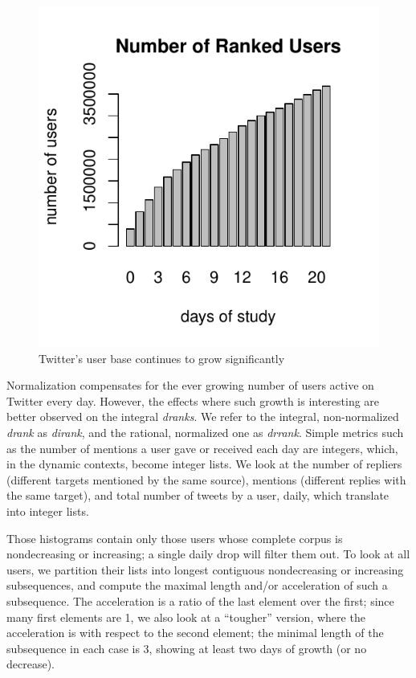 \documentclass[10pt,oneside]{memoir}
\begin{document}
\begin{Spacing}{2}
\begin{figure}
\begin{center}
\includegraphics{figures/daily-users}
\caption{Twitter's user base continues to grow significantly}
\label{figure:daily-users}
\end{center}
\end{figure}
Normalization compensates for the ever growing number of users active on Twitter every day.  However, the effects where such growth is interesting are better observed on the integral {\itshape dranks}.  We refer to the integral, non-normalized {\itshape drank} as {\itshape dirank}, and the rational, normalized one as {\itshape drrank}.
Simple metrics such as the number of mentions a user gave or received each day are integers, which, in the dynamic contexts, become integer lists.  We look at the number of repliers (different targets mentioned by the same source), mentions (different replies with the same target), and total number of tweets by a user, daily, which translate into integer lists.


Those histograms contain only those users whose complete corpus is nondecreasing or increasing; a single daily drop will filter them out.  To look at all users, we partition their lists into longest contiguous nondecreasing or increasing subsequences, and compute the maximal length and/or acceleration of such a subsequence.  The acceleration is a ratio of the last element over the first; since many first elements are 1, we also look at a ``tougher'' version, where the acceleration is with respect to the second element; the minimal length of the subsequence in each case is 3, showing at least two days of growth (or no decrease).



\end{Spacing}
\end{document}
